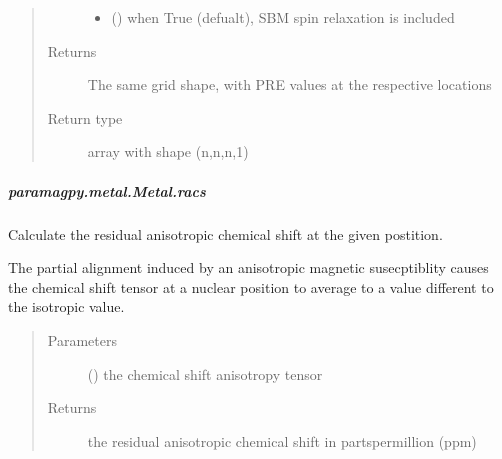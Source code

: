\documentclass[a4paper,10pt,english,openany,oneside]{sphinxmanual}
\begin{document}
\begin{fulllineitems}
\begin{fulllineitems}
\begin{fulllineitems}
\begin{quote}
\begin{description}
\begin{itemize}
\item {} 
\sphinxAtStartPar
{} (\sphinxstyleliteralemphasis{\sphinxupquote{ (}}\sphinxstyleliteralemphasis{\sphinxupquote{)}}) \textendash{} when True (defualt), SBM spin relaxation is included

\end{itemize}

\item[{Returns}] \leavevmode
\sphinxAtStartPar
{} \textendash{} The same grid shape, with PRE values at the respective locations

\item[{Return type}] \leavevmode
\sphinxAtStartPar
array with shape (n,n,n,1)

\end{description}\end{quote}

\end{fulllineitems}



\subparagraph{paramagpy.metal.Metal.racs}
\label{\detokenize{reference/generated/paramagpy.metal.Metal.racs:paramagpy-metal-metal-racs}}\label{\detokenize{reference/generated/paramagpy.metal.Metal.racs::doc}}

\begin{fulllineitems}
\label{\detokenize{reference/generated/paramagpy.metal.Metal.racs:paramagpy.metal.Metal.racs}}
\sphinxAtStartPar
Calculate the residual anisotropic chemical shift at the
given postition.

\sphinxAtStartPar
The partial alignment induced by an anisotropic
magnetic susecptiblity causes the chemical shift tensor at a nuclear
position to average to a value different to the isotropic value.
\begin{quote}\begin{description}
\item[{Parameters}] \leavevmode
\sphinxAtStartPar
{} () \textendash{} the chemical shift anisotropy tensor

\item[{Returns}] \leavevmode
\sphinxAtStartPar
{} \textendash{} the residual anisotropic chemical shift in parts\sphinxhyphen{}per\sphinxhyphen{}million (ppm)


\end{description}
\end{quote}
\end{fulllineitems}
\end{fulllineitems}
\end{fulllineitems}
\end{document}
